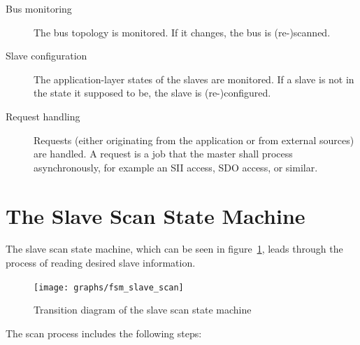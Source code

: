 \documentclass[a4paper,12pt,BCOR6mm,bibtotoc,idxtotoc]{scrbook}
\begin{document}
\begin{description}

\item[Bus monitoring] The bus topology is monitored. If it changes, the bus is
(re-)scanned.

\item[Slave configuration] The application-layer states of the slaves are
monitored. If a slave is not in the state it supposed to be, the slave is
(re-)configured.

\item[Request handling] Requests (either originating from the application or
from external sources) are handled. A request is a job that the master shall
process asynchronously, for example an SII access, SDO access, or similar.

\end{description}


\section{The Slave Scan State Machine}
\label{sec:fsm-scan}

The slave scan state machine, which can be seen in
figure~\ref{fig:fsm-slavescan}, leads through the process of reading desired
slave information.

\begin{figure}[htbp]
  \centering
  \texttt{[image: graphs/fsm\_slave\_scan]}
  \caption{Transition diagram of the slave scan state machine}
  \label{fig:fsm-slavescan}
\end{figure}

The scan process includes the following steps:
\end{document}
